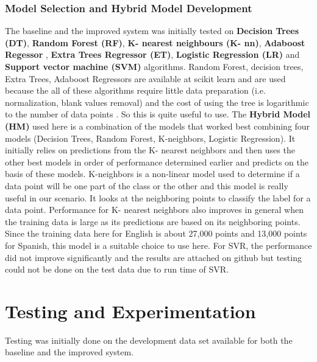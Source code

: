 \documentclass[10pt,a4paper]{article}
\begin{document}
\subsubsection{Model Selection and Hybrid Model Development} 
The baseline and the  improved system was initially tested on\textbf{ Decision Trees (DT)}, \textbf{Random Forest (RF)}, \textbf{K- nearest neighbours (K- nn)}, \textbf{Adaboost  Regessor} ,\textbf{ Extra Trees Regressor (ET)},\textbf{ Logistic Regression (LR)} and \textbf{Support vector machine (SVM)}  algorithms. Random Forest, decision trees, Extra Trees, Adaboost Regressors are available at scikit learn and are used because the all of these algorithms require little data preparation (i.e. normalization, blank values removal) and the cost of using the tree is logarithmic to the number of data points \cite{scikit-learn}. So this is quite useful to use. The \textbf{Hybrid Model (HM)} used here is a combination of the models that worked best combining four models (Decision Trees, Random Forest, K-neighbors, Logistic Regression). It initially relies on predictions from the K- nearest neighbors and then uses the other best models in order of performance determined earlier and predicts on the basis of these models. K-neighbors is a non-linear model used to determine if a data point will be one part of the class or the other and this model is really useful in our scenario. It looks at the neighboring points to classify the label for a data point. Performance for K- nearest neighbors also improves in general when the training data is large as its predictions are based on its neighboring points. Since the training data here for English is about 27,000 points and 13,000 points for Spanish, this model is a suitable choice to use here. For SVR, the performance did not improve significantly and the results are attached on github but testing could not be done on the test data due to run time of SVR.


\section{Testing and Experimentation}

Testing was initially done on the development data set available for both the baseline and the improved system.
\end{document}
